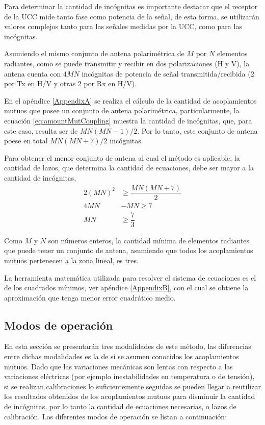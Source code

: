 Para determinar la cantidad de incógnitas es importante destacar que el receptor de la UCC mide tanto fase como potencia de la
señal, de esta forma, se utilizarán valores complejos tanto para las señales medidas por la UCC, como para las incógnitas.

Asumiendo el mismo conjunto de antena polarimétrica de $M$ por $N$ elementos radiantes, como se puede transmitir y recibir en
dos polarizaciones (H y V), la antena cuenta con $4MN$ incógnitas de potencia de señal transmitida/recibida (2 por Tx en H/V y
otras 2 por Rx en H/V).

En el apéndice \ref{AppendixA} se realiza el cálculo de la cantidad de acoplamientos mutuos que posee un conjunto de antena
polarimétrica, particularmente, la ecuación \ref{eq:amountMutCoupling} muestra la cantidad de incógnitas, que, para este caso,
resulta ser de $MN(MN-1)/2$. Por lo tanto, este conjunto de antena poese en total $MN(MN + 7)/2$ incógnitas.

Para obtener el menor conjunto de antena al cual el método es aplicable, la cantidad de lazos, que determina la cantidad de
ecuaciones, debe ser mayor a la cantidad de incógnitas, 
$$
\begin{aligned}
	2(MN)^2 &\ge  \dfrac{MN(MN + 7)}{2} \\
	4MN &- MN \ge7 \\
	MN &\ge \dfrac{7}{3}
\end{aligned}
$$

Como $M$ y $N$ son números enteros, la cantidad mínima de elementos radiantes que puede tener un conjunto de antena, asumiendo
que todos los acoplamientos mutuos pertenecen a la zona lineal, es tres.

La herramienta matemática utilizada para resolver el sistema de ecuaciones es el de los cuadrados mínimos,
ver apéndice \ref{AppendixB}, con el cual se obtiene la aproximación que tenga menor error cuadrático medio.


\subsection{Modos de operación}

En esta sección se presentarán tres modalidades de este método, las diferencias entre dichas modalidades es la de si se asumen
conocidos los acoplamientos mutuos. Dado que las variaciones mecánicas son lentas con respecto a las variaciones eléctricas
(por ejemplo inestabilidades en temperatura o de tensión), si se realizan calibraciones lo suficientemente seguidas se pueden
llegar a reutilizar los resultados obtenidos de los acoplamientos mutuos para disminuir la cantidad de incógnitas, por lo tanto
la cantidad de ecuaciones necesarias, o lazos de calibración. Los diferentes modos de operación se listan a continuación:

